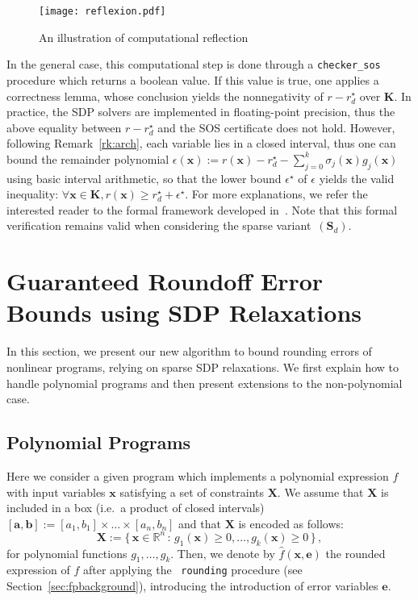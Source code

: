 \documentclass[preprint]{sigplanconf}
\newcommand{\code}[1]{\lstinline{#1}}
\newcommand{\R}{\mathbb{R}}
\newcommand{\x}{\mathbf{x}}
\newcommand{\e}{\mathbf{e}}
\renewcommand{\b}{\mathbf{b}}
\def\a{\mathbf{a}}
\def\S{\mathbf{S}}
\def\K{\mathbf{K}}
\def\S{\mathbf{S}}
\def\X{\mathbf{X}}
\theoremstyle{plain}
\begin{document}
\fi
%
\begin{figure}[!ht]
\centering
\texttt{[image: reflexion.pdf]}
\caption{An illustration of computational reflection}	
\label{fig:reflexion}
\end{figure}
%
In the general case, this computational step is done through a \code{checker_sos} procedure which returns a boolean value. If this value is true, one applies a correctness lemma, whose conclusion yields the nonnegativity of $r - r_d^\star$ over $\K$.
In practice, the SDP solvers are implemented in floating-point precision, thus the above equality between $r - r_d^\star$ and the SOS certificate does not hold. However, following Remark~\ref{rk:arch}, each variable lies in a closed interval, thus one can bound the remainder polynomial $\epsilon(\x) := r(\x) - r_d^\star - \sum_{j=0}^k \sigma_j(\x) g_j(\x)$ using basic interval arithmetic, so that the lower bound $\epsilon^\star$ of $\epsilon$ yields the valid inequality: $\forall \x \in \K, r(\x) \geq r_d^\star + \epsilon^\star$.
For more explanations, we refer the interested reader to the formal framework developed in~\cite{jfr14}. Note that this formal verification remains valid when considering the sparse variant~$(\S_d)$.
%
\section{Guaranteed Roundoff Error Bounds using SDP Relaxations}
\label{sec:fpsdp}
In this section, we present our new algorithm to bound rounding errors of nonlinear programs, relying on sparse SDP relaxations. We first explain how to handle polynomial programs and then present extensions to the non-polynomial case.
\subsection{Polynomial Programs}
Here we consider a given program which implements a polynomial expression $f$ with input variables $\x$ satisfying a set of constraints $\X$. We assume that  $\X$ is included in a box (i.e.~a product of closed intervals) $[\a, \b] := [a_1, b_1] \times \dots \times [a_n, b_n]$ and that $\X$ is encoded as follows: 
\[ 
\X := \{\, \x \in \R^n \, : \, g_1 (\x) \geq 0, \dots, g_{k} (\x) \geq 0 \,\} \,,
\]
for polynomial functions $g_1, \dots, g_k$. 
%
Then, we denote by $\hat{f}(\x,\e)$ the rounded expression of $f$ after applying the ~\lstinline|rounding| procedure (see Section~\ref{sec:fpbackground}), introducing the introduction of error variables $\e$. 
\end{document}
